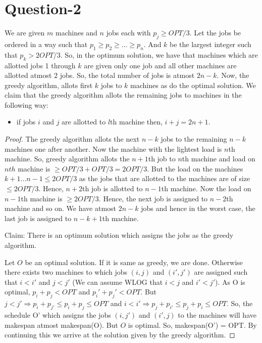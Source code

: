 \documentclass{article}
\begin{document}
\section{Question-2}
We are given $m$ machines and $n$ jobs each with $p_j \geq OPT/3$. Let the jobs be ordered in a way such that $p_1 \geq p_2 \geq \ldots \geq p_n$. And $k$ be the largest integer such that $p_k > 2OPT/3$. So, in the optimum solution, we have that machines which are allotted jobs 1 through $k$ are given only one job and all other machines are allotted atmost $2$ jobs. So, the total number of jobs is atmost $2n-k$. Now, the greedy algorithm, allots first $k$ jobs to $k$ machines as do the optimal solution. We claim that the greedy algorithm allots the remaining jobs to machines in the following way:
\begin{itemize}
\item if jobs $i$ and $j$ are allotted to $l$th machine then, $i+j = 2n+1$.
\end{itemize}
\begin{proof}
The greedy algorithm allots the next $n-k$ jobs to the remaining $n-k$ machines one after another.  Now the machine with the lightest load is $n$th machine. So, greedy algorithm allots the $n+1$th job to $n$th machine and load on $nth$ machine is $\geq OPT/3+OPT/3 = 2OPT/3$. But the load on the machines $k+1\ldots n-1 \leq 2OPT/3$ as the jobs that are allotted to the machines are of size $\leq 2OPT/3$. Hence, $n+2$th job is allotted to $n-1$th machine. Now the load on $n-1$th machine is $\geq 2OPT/3$. Hence, the next job is assigned to $n-2$th machine and so on. We have atmost $2n-k$ jobs and hence in the worst case, the last job is assigned to $n-k+1$th machine. 

\noindent
Claim: There is an optimum solution which assigns the jobs as the greedy algorithm. 

Let $O$ be an optimal solution. If it is same as greedy, we are done. Otherwise there exists two machines to which jobs $(i,j)$ and $(i',j')$ are assigned such that $i < i'$ and $j < j'$ (We can assume WLOG that $i < j$ and $i' < j'$). As O is optimal, $p_i + p_j < OPT$ and $p_i' + p_j' < OPT$. But $j < j' \Rightarrow p_i + p_{j'} \leq p_i + p_j \leq OPT$ and $i < i' \Rightarrow p_j + p_{i'} \leq p_j + p_i \leq OPT$. So, the schedule O' which assigns the jobs $(i,j')$ and $(i',j)$ to the machines will have makespan atmost makespan(O). But $O$ is optimal. So, makespan(O') = OPT. By continuing this we arrive at the solution given by the greedy algorithm.
\end{proof}
\end{document}
